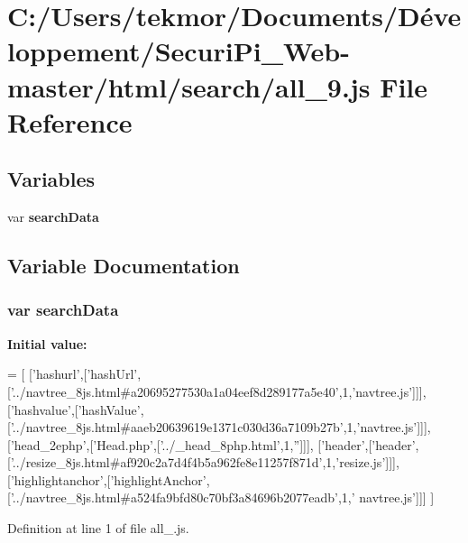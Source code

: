 \section{C\+:/\+Users/tekmor/\+Documents/\+Développement/\+Securi\+Pi\+\_\+\+Web-\/master/html/search/all\+\_\+9.js File Reference}
\label{all__9_8js}
\subsection*{Variables}
\begin{DoxyCompactItemize}
\item 
var {\bf search\+Data}
\end{DoxyCompactItemize}


\subsection{Variable Documentation}
\subsubsection[{search\+Data}]{\setlength{\rightskip}{0pt plus 5cm}var search\+Data}\label{all__9_8js_ad01a7523f103d6242ef9b0451861231e}
{\bfseries Initial value\+:}
\begin{DoxyCode}
=
[
  [\textcolor{stringliteral}{'hashurl'},[\textcolor{stringliteral}{'hashUrl'},[\textcolor{stringliteral}{'../navtree\_8js.html#a20695277530a1a04eef8d289177a5e40'},1,\textcolor{stringliteral}{'navtree.js'}]]],
  [\textcolor{stringliteral}{'hashvalue'},[\textcolor{stringliteral}{'hashValue'},[\textcolor{stringliteral}{'../navtree\_8js.html#aaeb20639619e1371c030d36a7109b27b'},1,\textcolor{stringliteral}{'navtree.js'}]]],
  [\textcolor{stringliteral}{'head\_2ephp'},[\textcolor{stringliteral}{'Head.php'},[\textcolor{stringliteral}{'../\_head\_8php.html'},1,\textcolor{stringliteral}{''}]]],
  [\textcolor{stringliteral}{'header'},[\textcolor{stringliteral}{'header'},[\textcolor{stringliteral}{'../resize\_8js.html#af920c2a7d4f4b5a962fe8e11257f871d'},1,\textcolor{stringliteral}{'resize.js'}]]],
  [\textcolor{stringliteral}{'highlightanchor'},[\textcolor{stringliteral}{'highlightAnchor'},[\textcolor{stringliteral}{'../navtree\_8js.html#a524fa9bfd80c70bf3a84696b2077eadb'},1,\textcolor{stringliteral}{'
      navtree.js'}]]]
]
\end{DoxyCode}


Definition at line 1 of file all\+\_.\+js.

